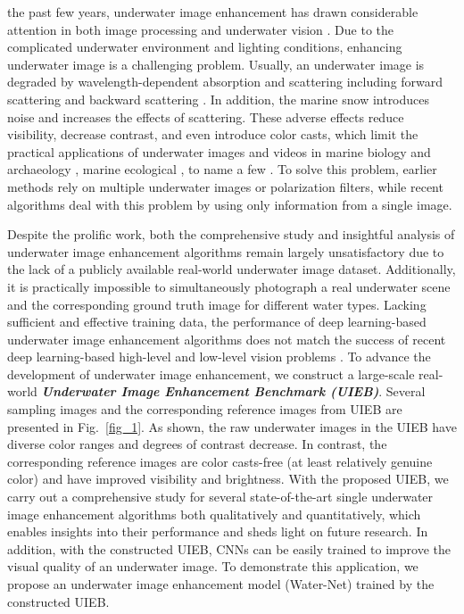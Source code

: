 \documentclass[journal]{IEEEtran}
\begin{document}
 the past few years, underwater image enhancement has drawn considerable attention in both image processing and underwater vision \cite{Jaffe2015,Sheinin2016}. Due to the complicated underwater environment and lighting conditions, enhancing underwater image is a challenging problem. Usually, an underwater image is degraded by wavelength-dependent absorption and scattering including forward scattering and backward scattering \cite{McGlamery1980,Jaffe1990,Hou2012,Akkaynak2017,Akkaynak20172}. In addition, the marine snow introduces noise and increases the effects of scattering. These adverse effects reduce visibility, decrease contrast, and even introduce color casts, which limit the practical applications of underwater images and videos in marine biology and archaeology \cite{Ludvigsen2007}, marine ecological \cite{Strachan1993}, to name a few
\cite{YangSurvey}. To solve this problem, earlier methods rely on multiple underwater images or polarization filters, while recent algorithms deal with this problem by using only information from a single image.


Despite the prolific work, both the comprehensive study and insightful analysis of underwater image enhancement algorithms remain largely unsatisfactory due to the lack of a publicly available real-world underwater image dataset.
Additionally, it is practically impossible to simultaneously photograph a real underwater scene and the corresponding ground truth image for different water types.
Lacking sufficient and effective training data, the performance of deep learning-based underwater image enhancement algorithms does not match the success of recent deep learning-based high-level and low-level vision problems \cite{Dehazing,Survey,tgars,Ctc,Depth}.
To advance the development of underwater image enhancement, we construct a large-scale real-world \textbf{\emph{Underwater Image Enhancement Benchmark (UIEB)}}. Several sampling images and the corresponding reference images from UIEB are presented in Fig.~\ref{fig_1}. As shown, the raw underwater images in the UIEB have diverse color ranges and degrees of contrast decrease. In contrast, the corresponding reference images are color casts-free (at least relatively genuine color) and have improved visibility and brightness.
With the proposed UIEB, we carry out a comprehensive study for several state-of-the-art single underwater image enhancement algorithms both qualitatively and quantitatively, which enables insights into their performance and sheds light on future research.
In addition, with the constructed UIEB, CNNs can be easily trained to improve the visual quality of an underwater image. To demonstrate this application, we propose an underwater image enhancement model (Water-Net) trained by  the constructed UIEB.
\end{document}
